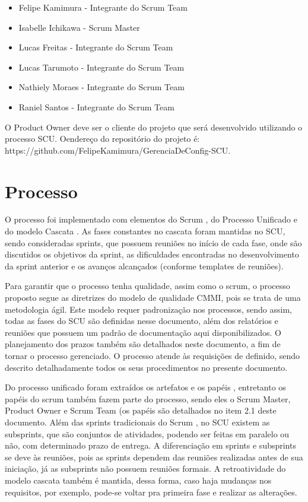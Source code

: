 \documentclass[	DIV=calc,%
							paper=a4,%
							fontsize=12pt,%
							onecolumn]{scrartcl}%
\begin{document}
\begin{itemize}
	\item Felipe Kamimura - Integrante do Scrum Team
	\item Isabelle Ichikawa - Scrum Master
	\item Lucas Freitas - Integrante do Scrum Team
	\item Lucas Tarumoto - Integrante do Scrum Team
	\item Nathiely Moraes - Integrante do Scrum Team
    \item Raniel Santos - Integrante do Scrum Team
\end{itemize}

O Product Owner deve ser o cliente do projeto que será desenvolvido utilizando o processo SCU. Oendereço do repositório do projeto é: \\
https://github.com/FelipeKamimura/GerenciaDeConfig-SCU.


\section{Processo}

O processo foi implementado com elementos do Scrum \cite{sutherland2014scrum}, do Processo Unificado \cite{scott2003processo} e do modelo Cascata \cite{sommervilleengenharia}. As fases constantes no cascata \cite{sommervilleengenharia} foram mantidas no SCU, sendo consideradas sprints, que possuem reuniões no início de cada fase, onde são discutidos os objetivos da sprint, as dificuldades encontradas no desenvolvimento da sprint anterior e os avanços alcançados (conforme templates de reuniões).

Para garantir que o processo tenha qualidade, assim como o scrum, o processo proposto segue as diretrizes do modelo de qualidade CMMI, pois se trata de uma metodologia ágil. Este modelo requer padronização nos processos, sendo assim, todas as fases do SCU são definidas nesse documento, além dos relatórios e reuniões que possuem um padrão de documentação aqui disponibilizados. O planejamento dos prazos também são detalhados neste documento, a fim de tornar o processo gerenciado. O processo atende às requisições de definido, sendo descrito detalhadamente todos os seus procedimentos no presente documento.

Do processo unificado foram extraídos os artefatos e os papéis \cite{scott2003processo}, entretanto os papéis do scrum \cite{sutherland2014scrum}também fazem parte do processo, sendo eles o Scrum Master, Product Owner e Scrum Team \cite{sutherland2014scrum} (os papéis são detalhados no item 2.1 deste documento. Além das sprints tradicionais do Scrum \cite{sutherland2014scrum}, no SCU existem as subsprints, que são conjuntos de atividades, podendo ser feitas em paralelo ou não, com determinado prazo de entrega. A diferenciação em sprints e subsprints se deve às reuniões, pois as sprints dependem das reuniões realizadas antes de sua iniciação, já as subsprints não possuem reuniões formais. A retroatividade do modelo cascata também é mantida, dessa forma, caso haja mudanças nos requisitos, por exemplo, pode-se voltar pra primeira fase e realizar as alterações.
\end{document}
